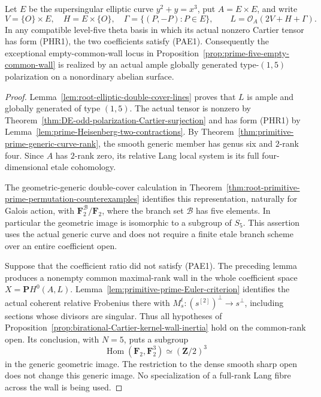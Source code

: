 \begin{proposition}
\label{prop:prime-five-actual-exceptional-ratio}
Let \(E\) be the supersingular elliptic curve
\(y^2+y=x^3\), put \(A=E\times E\), and write
\[
 V=\{O\}\times E,\quad H=E\times\{O\},\quad
 \Gamma=\{(P,-P):P\in E\},\qquad
                  L=\mathcal O_A(2V+H+\Gamma).     \tag{PAE4}
\]
In any compatible level-five theta basis in which its actual
nonzero Cartier tensor has form (PHR1), the two coefficients
satisfy (PAE1).  Consequently the exceptional empty-common-wall
locus in Proposition~\ref{prop:prime-five-empty-common-wall}
is realized by an actual ample globally generated
type-\((1,5)\) polarization on a nonordinary abelian surface.
\end{proposition}
\begin{proof}
Lemma~\ref{lem:root-elliptic-double-cover-lines} proves that
\(L\) is ample and globally generated of type \((1,5)\).
The actual tensor is nonzero by
Theorem~\ref{thm:DE-odd-polarization-Cartier-surjection} and has
form (PHR1) by Lemma~\ref{lem:prime-Heisenberg-two-contractions}.
By Theorem~\ref{thm:primitive-prime-generic-curve-rank}, the
smooth generic member has genus six and \(2\)-rank four.
Since \(A\) has \(2\)-rank zero, its relative Lang local
system is its full four-dimensional etale cohomology.

The geometric-generic double-cover calculation in
Theorem~\ref{thm:root-primitive-prime-permutation-counterexamples}
identifies this representation, naturally for Galois action,
with \(\mathbf F_2^{\mathcal B}/\mathbf F_2\), where the
branch set \(\mathcal B\) has five elements.  In particular
the geometric image is isomorphic to a subgroup of \(S_5\).
This assertion uses the actual generic curve and does not
require a finite etale branch scheme over an entire coefficient
open.

Suppose that the coefficient ratio did not satisfy (PAE1).
The preceding lemma produces a nonempty common maximal-rank
wall in the whole coefficient space \(X=\mathbf P H^0(A,L)\).
Lemma~\ref{lem:primitive-prime-Euler-criterion} identifies the
actual coherent relative Frobenius there with
\(M_s^t:(s^{[2]})^\perp\to s^\perp\), including sections
whose divisors are singular.  Thus all hypotheses of
Proposition~\ref{prop:birational-Cartier-kernel-wall-inertia}
hold on the common-rank open.  Its conclusion, with \(N=5\),
puts a subgroup
\[
          \operatorname{Hom}(\mathbf F_2,\mathbf F_2^3)
                        \simeq (\mathbf Z/2)^3       \tag{PAE5}
\]
in the generic geometric image.  The restriction to the dense
smooth sharp open does not change this generic image.  No
specialization of a full-rank Lang fibre across the wall is
being used.


\end{proof}
